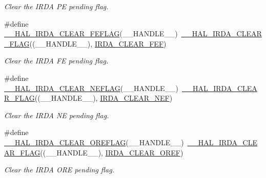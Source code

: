 \begin{DoxyCompactItemize}
\begin{DoxyCompactList}\small\item\em Clear the I\+R\+DA PE pending flag. \end{DoxyCompactList}\item 
\#define \hyperlink{group___i_r_d_a___exported___macros_gaac85c179f4f6761f34acd00a4f8fdccb}{\+\_\+\+\_\+\+H\+A\+L\+\_\+\+I\+R\+D\+A\+\_\+\+C\+L\+E\+A\+R\+\_\+\+F\+E\+F\+L\+AG}(\+\_\+\+\_\+\+H\+A\+N\+D\+L\+E\+\_\+\+\_\+)~\hyperlink{group___i_r_d_a___exported___macros_ga4ebf474ecfd858f9320bef9bc67c0bce}{\+\_\+\+\_\+\+H\+A\+L\+\_\+\+I\+R\+D\+A\+\_\+\+C\+L\+E\+A\+R\+\_\+\+F\+L\+AG}((\+\_\+\+\_\+\+H\+A\+N\+D\+L\+E\+\_\+\+\_\+), \hyperlink{group___i_r_d_a___i_t___c_l_e_a_r___flags_ga8974fb094f7e7c623ba81aea05de2543}{I\+R\+D\+A\+\_\+\+C\+L\+E\+A\+R\+\_\+\+F\+EF})
\begin{DoxyCompactList}\small\item\em Clear the I\+R\+DA FE pending flag. \end{DoxyCompactList}\item 
\#define \hyperlink{group___i_r_d_a___exported___macros_gab93a0324a6fd84860dda19165e0dc9fd}{\+\_\+\+\_\+\+H\+A\+L\+\_\+\+I\+R\+D\+A\+\_\+\+C\+L\+E\+A\+R\+\_\+\+N\+E\+F\+L\+AG}(\+\_\+\+\_\+\+H\+A\+N\+D\+L\+E\+\_\+\+\_\+)~\hyperlink{group___i_r_d_a___exported___macros_ga4ebf474ecfd858f9320bef9bc67c0bce}{\+\_\+\+\_\+\+H\+A\+L\+\_\+\+I\+R\+D\+A\+\_\+\+C\+L\+E\+A\+R\+\_\+\+F\+L\+AG}((\+\_\+\+\_\+\+H\+A\+N\+D\+L\+E\+\_\+\+\_\+), \hyperlink{group___i_r_d_a___i_t___c_l_e_a_r___flags_gab2fec5f35837bc513cb9fa958f482a4f}{I\+R\+D\+A\+\_\+\+C\+L\+E\+A\+R\+\_\+\+N\+EF})
\begin{DoxyCompactList}\small\item\em Clear the I\+R\+DA NE pending flag. \end{DoxyCompactList}\item 
\#define \hyperlink{group___i_r_d_a___exported___macros_ga43c79a3caa8de46f51b8f0b597e89377}{\+\_\+\+\_\+\+H\+A\+L\+\_\+\+I\+R\+D\+A\+\_\+\+C\+L\+E\+A\+R\+\_\+\+O\+R\+E\+F\+L\+AG}(\+\_\+\+\_\+\+H\+A\+N\+D\+L\+E\+\_\+\+\_\+)~\hyperlink{group___i_r_d_a___exported___macros_ga4ebf474ecfd858f9320bef9bc67c0bce}{\+\_\+\+\_\+\+H\+A\+L\+\_\+\+I\+R\+D\+A\+\_\+\+C\+L\+E\+A\+R\+\_\+\+F\+L\+AG}((\+\_\+\+\_\+\+H\+A\+N\+D\+L\+E\+\_\+\+\_\+), \hyperlink{group___i_r_d_a___i_t___c_l_e_a_r___flags_gaef356fb07cf820843d8863ee30212a78}{I\+R\+D\+A\+\_\+\+C\+L\+E\+A\+R\+\_\+\+O\+R\+EF})
\begin{DoxyCompactList}\small\item\em Clear the I\+R\+DA O\+RE pending flag. \end{DoxyCompactList}\item 

\end{DoxyCompactItemize}
